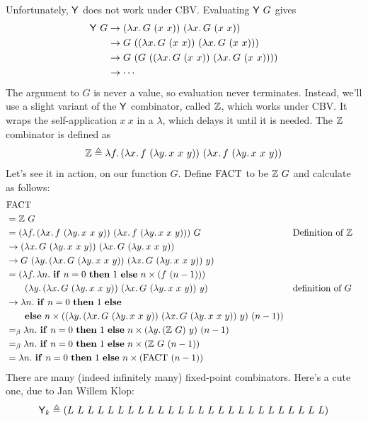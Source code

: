 Unfortunately, $\mathsf{Y}$ does not work under CBV. Evaluating $\mathsf{Y}\ G$ gives
\begin{align*}
  \mathsf{Y}\ G&\to(\lambda x.\,G\ (x\ x))\ (\lambda x.\,G\ (x\ x))\\
  &\to G\ ((\lambda x.\,G\ (x\ x))\ (\lambda x.\,G\ (x\ x)))\\
  &\to G\ (G\ ((\lambda x.\,G\ (x\ x))\ (\lambda x.\,G\ (x\ x))))\\
  &\to\cdots
\end{align*}
The argument to $G$ is never a value, so evaluation never terminates. Instead, we'll use a slight
variant of the $\mathsf{Y}$ combinator, called $\mathbb{Z}$, which works under CBV. It wraps the self-application
$x\ x$ in a $\lambda$, which delays it until it is needed. The $\mathbb{Z}$ combinator is defined as
\[
  \mathbb{Z}\triangleq\lambda f.\,(\lambda x.\,f\ (\lambda y.\,x\ x\ y))\ (\lambda x.\,f\ (\lambda y.\,x\ x\ y))
\]
Let's see it in action, on our function $G$. Define $\mathrm{FACT}$ to be $\mathbb{Z}\ G$ and calculate as follows:
\begin{align*}
  &\FACT\\
  &=\Z\ G\\
  &=(\lambda f.\,(\lambda x.\,f\ (\lambda y.\,x\ x\ y))\ (\lambda x.\,f\ (\lambda y.\,x\ x\ y)))\ G
    && \text{Definition of } \Z\\
  &\to(\lambda x.\,G\ (\lambda y.\,x\ x\ y))\ (\lambda x.\,G\ (\lambda y.\,x\ x\ y))\\
  &\to G\ (\lambda y.\,(\lambda x.\,G\ (\lambda y.\,x\ x\ y))\ (\lambda x.\,G\ (\lambda y.\,x\ x\ y))\ y)\\
  &=(\lambda f.\,\lambda n.\ \ite{n=0}{1}{n\times(f\ (n-1))})\\
  &\qquad(\lambda y.\,(\lambda x.\,G\ (\lambda y.\,x\ x\ y))\ (\lambda x.\,G\ (\lambda y.\,x\ x\ y))\ y)
    && \text{definition of } G\\
  &\to\lambda n.\ \ite{n=0}{1}{}\\
  &\qquad\mathbf{else}\ n\times((\lambda y.\,(\lambda x.\,G\ (\lambda y.\,x\ x\ y))\ (\lambda x.\,G\ (\lambda y.\,x\ x\ y))\ y)\ (n-1))\\
  &=_\beta\lambda n.\ \ite{n=0}{1}{n\times(\lambda y.\,(\Z\ G)\ y)\ (n-1)}\\
  &=_\beta\lambda n.\ \ite{n=0}{1}{n\times(\Z\ G\ (n-1))}\\
  &=\lambda n.\ \ite{n=0}{1}{n\times(\FACT\ (n-1))}
\end{align*}
There are many (indeed infinitely many) fixed-point combinators. Here's a cute one, due to Jan Willem
Klop:
\[
  \Y_k\triangleq(L\ L\ L\ L\ L\ L\ L\ L\ L\ L\ L\ L\ L\ L\ L\ L\ L\ L\ L\ L\ L\ L\ L\ L\ L\ L)
\]
